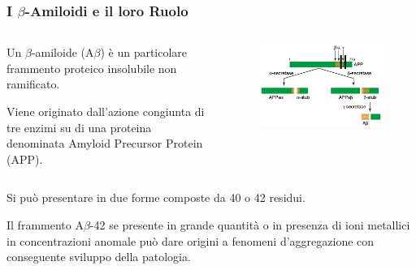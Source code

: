 \documentclass[9pt]{beamer}
\begin{document}
\begin{frame}
	\frametitle{I $\beta$-Amiloidi e il loro Ruolo}
	\bigskip
	\begin{columns}
		\begin{column}{0.5\textwidth}
			Un $\beta$-amiloide (A$\beta$) è un particolare frammento proteico insolubile non ramificato.
			
			\smallskip
			Viene originato dall'azione congiunta di tre enzimi su di una proteina denominata Amyloid Precursor Protein (APP).
		\end{column}
		\begin{column}{0.5\textwidth}
			
			\begin{figure}
				\includegraphics[width=\textwidth]{immagini/APP.png}
			\end{figure}
		\end{column}
	\end{columns}
	
	\medskip
	Si può presentare in due forme composte da 40 o 42 residui.
	
	Il frammento A$\beta$-42 se presente in grande quantità o in presenza di ioni metallici in concentrazioni anomale può dare origini a fenomeni d'aggregazione con conseguente sviluppo della patologia.
	
\end{frame}
\end{document}
